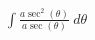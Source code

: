 \documentclass[preview]{standalone}
\begin{document}
\begin{align*}
\int \frac{a\sec^2(\theta)}{a\sec(\theta)} \ d\theta
\end{align*}
\end{document}
